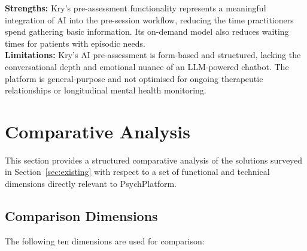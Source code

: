 \begin{tcolorbox}[colback=lightgray, colframe=accentblue, title=\textbf{Kry / LIVI — Assessment}, fonttitle=\bfseries, sharp corners=south]
  \textbf{Strengths:} Kry's pre-assessment functionality represents a meaningful
  integration of AI into the pre-session workflow, reducing the time practitioners
  spend gathering basic information. Its on-demand model also reduces waiting
  times for patients with episodic needs. \\[4pt]
  \textbf{Limitations:} Kry's AI pre-assessment is form-based and structured,
  lacking the conversational depth and emotional nuance of an LLM-powered chatbot.
  The platform is general-purpose and not optimised for ongoing therapeutic
  relationships or longitudinal mental health monitoring.
\end{tcolorbox}

\section{Comparative Analysis}
\label{sec:comparison}

This section provides a structured comparative analysis of the solutions surveyed
in Section~\ref{sec:existing} with respect to a set of functional and technical
dimensions directly relevant to PsychPlatform.

\subsection{Comparison Dimensions}

The following ten dimensions are used for comparison:

